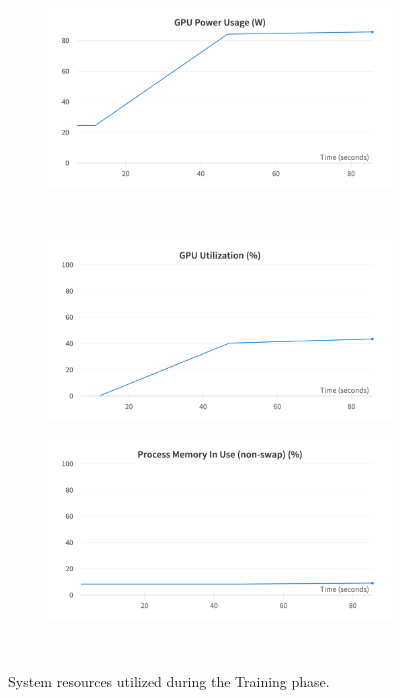 \begin{figure}[H]
\begin{subfigure}{0.43\textwidth}
	\end{subfigure}
	\begin{subfigure}{0.43\textwidth}
		\centering
		\includegraphics[width=\textwidth]{chapters/3_models/imgs/grrun/grrungpupowerw.png}
	\end{subfigure}\\
	\begin{subfigure}{0.43\textwidth}
		\centering
		\includegraphics[width=\textwidth]{chapters/3_models/imgs/grrun/grrungputuilizationperc.png}
	\end{subfigure}
	\begin{subfigure}{0.43\textwidth}
		\centering
		\includegraphics[width=\textwidth]{chapters/3_models/imgs/grrun/grrunmemusage.png}
	\end{subfigure}\\
	\caption{System resources utilized during the Training phase.}
	\label{fig:grrunsysusage}
\end{figure}


